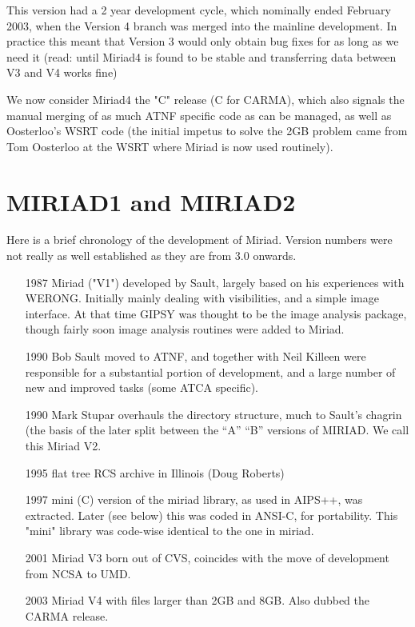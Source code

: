 This version had a 2 year development cycle, which nominally ended February 2003,
when the Version 4 branch was merged into the mainline development. 
In practice this meant that Version 3 would
only obtain bug fixes for as long as we need it (read: until Miriad4 is found to be
stable and transferring data between V3 and V4 works fine)

We now consider Miriad4 the "C" release (C for CARMA), which also signals the 
manual merging of as much ATNF specific code as can be managed, 
as well as Oosterloo's WSRT code (the initial
impetus to solve the 2GB problem came from Tom Oosterloo at the WSRT where Miriad
is now used routinely).


\section{MIRIAD1 and MIRIAD2}

Here is a brief chronology of the development of Miriad. Version numbers were not
really as well established as they are from 3.0 onwards.

\begin{enumerate}
\item[1987] Miriad ("V1") developed by Sault, largely based on his experiences
with WERONG. Initially mainly dealing with visibilities, and a simple image
interface. At that time GIPSY was thought to be the image analysis package,
though fairly soon image analysis routines were added to Miriad.

\item[1990] Bob Sault moved to ATNF, and together with Neil Killeen were
responsible for a substantial portion of development, and a large number
of new and improved tasks (some ATCA specific).

\item[1990] Mark Stupar overhauls the directory structure, much to Sault's
chagrin (the basis of the later split between the ``A'' ``B'' versions of
MIRIAD.  We call this Miriad V2.

\item[1995] flat tree RCS archive in Illinois (Doug Roberts)

\item[1997] mini (C) version of the miriad library, as used in AIPS++, was extracted. 
Later (see below) this was coded in ANSI-C, for portability. This "mini"
library was code-wise identical to the one in miriad.

\item[2001] Miriad V3 born out of CVS, coincides with the move of development from
NCSA to UMD.

\item[2003] Miriad V4 with files larger than 2GB and 8GB. 
Also dubbed the CARMA release.

\end{enumerate}


